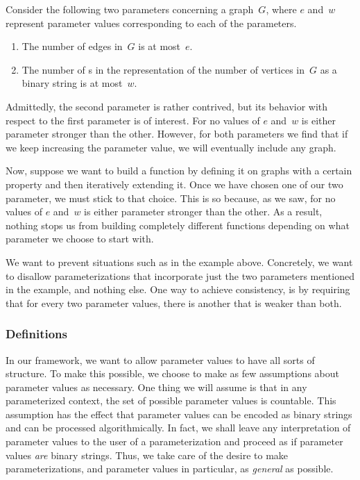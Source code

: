 \begin{example}
\label{ex:inconsistent}%
  Consider the following two parameters concerning a graph~$G$, where $e$ and~$w$ represent parameter values corresponding to each of the parameters.
  \begin{enumerate}
  \item The number of edges in~$G$ is at most~$e$.
  \item The number of s in the representation of the number of vertices in~$G$ as a binary string is at most~$w$.
  \end{enumerate}
  Admittedly, the second parameter is rather contrived, but its behavior with respect to the first parameter is of interest.
  For no values of $e$ and~$w$ is either parameter stronger than the other.
  However, for both parameters we find that if we keep increasing the parameter value, we will eventually include any graph.

  Now, suppose we want to build a function by defining it on graphs with a certain property and then iteratively extending it.
  Once we have chosen one of our two parameter, we must stick to that choice.
  This is so because, as we saw, for no values of $e$ and~$w$ is either parameter stronger than the other.
  As a result, nothing stops us from building completely different functions depending on what parameter we choose to start with.
\end{example}

We want to prevent situations such as in the example above.
Concretely, we want to disallow parameterizations that incorporate just the two parameters mentioned in the example, and nothing else.
One way to achieve consistency, is by requiring that for every two parameter values, there is another that is weaker than both.

\subsubsection{Definitions}
In our framework, we want to allow parameter values to have all sorts of structure.
To make this possible, we choose to make as few assumptions about parameter values as necessary.
One thing we will assume is that in any parameterized context, the set of possible parameter values is countable.
This assumption has the effect that parameter values can be encoded as binary strings and can be processed algorithmically.
In fact, we shall leave any interpretation of parameter values to the user of a parameterization and proceed as if parameter values \emph{are} binary strings.
Thus, we take care of the desire to make parameterizations, and parameter values in particular, as \emph{general} as possible.

